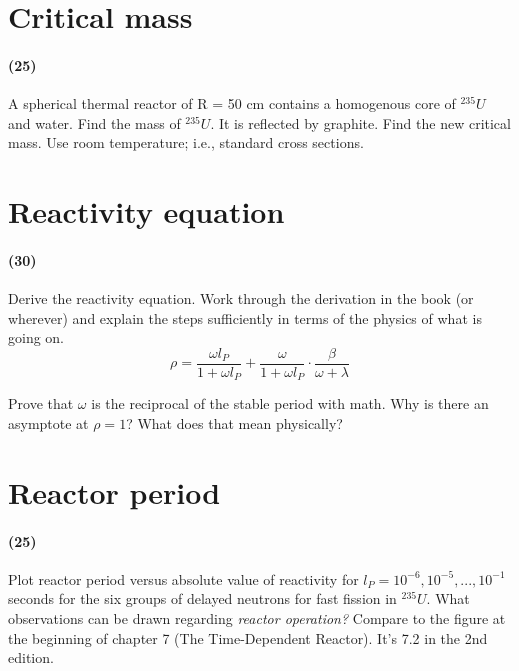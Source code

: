\documentclass[11pt,a4paper]{article}
\begin{document}
\newpage

\section{Critical mass}
\paragraph*{(25)}
A spherical thermal reactor of R = 50 cm contains a homogenous core of $^{235}U$ and water. Find the mass of $^{235}U$. It is reflected by graphite. Find the new critical mass. Use room temperature; i.e., standard cross sections.





\newpage

\section{Reactivity equation}
\paragraph*{(30)}
Derive the reactivity equation. Work through the derivation in the book (or wherever) and explain the steps sufficiently in terms of the physics of what is going on.
\begin{equation} \label{eq-reactivity}
    \rho=\frac{\omega l_P}{1+\omega l_P}+\frac{\omega}{1+\omega l_P}\cdot\frac{\beta}{\omega+\lambda}
\end{equation}

\vspace{\baselineskip}

\noindent Prove that $\omega$ is the reciprocal of the stable period with math. Why is there an asymptote at $\rho = 1$? What does that mean physically?





\newpage

\section{Reactor period}
\paragraph*{(25)}
Plot reactor period versus absolute value of reactivity for $l_P = 10^{-6},10^{-5},...,10^{-1}$ seconds for the six groups of delayed neutrons for fast fission in $^{235}U$. What observations can be drawn regarding \textit{reactor operation?} Compare to the figure at the beginning of chapter 7 (The Time-Dependent Reactor). It's 7.2 in the 2nd edition.
\end{document}
